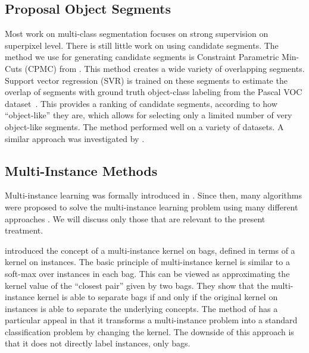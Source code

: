 \subsection{Proposal Object Segments}\label{related_segments}
Most work on multi-class segmentation focuses on strong supervision on superpixel level. There is still little work on using candidate segments.
The method we use for generating candidate segments is Constraint Parametric Min-Cuts (CPMC) from \citet{carreira2010constrained}.
This method creates a wide variety of overlapping segments. Support vector regression (SVR) is trained on these segments
to estimate the overlap of segments with ground truth object-class labeling
from the Pascal VOC dataset~\citep{pascal}. This provides a ranking of candidate segments, according to how ``object-like'' they are, which
allows for selecting only a limited number of very object-like segments.
The method performed well on a variety of datasets.
A similar approach was investigated by \citet{endres2010category}.

\subsection{Multi-Instance Methods}
Multi-instance learning was formally introduced in \citet{dietterich1997solving}.
Since then, many algorithms were proposed to solve the multi-instance learning problem
using many different approaches \citep{andrews2003support,gaertner2002multi,zhou2009multi,li2009convex,zhang2002dd,mangasarian2008multiple,leistner2010miforests,chen2006miles}.
We will discuss only those that are relevant to the present treatment.

\citet{gaertner2002multi} introduced the concept of a multi-instance
kernel on bags, defined in terms of a kernel on instances. 
The basic principle of multi-instance kernel is similar to a soft-max over instances in
each bag. This can be viewed as approximating the kernel value of the ``closest pair'' given by two bags. They show that the multi-instance kernel
is able to separate bags if and only if the original kernel on instances is able to separate the underlying concepts.
The method of \citet{gaertner2002multi} has a particular appeal in that it transforms a multi-instance problem into a standard
classification problem by changing the kernel. The downside of this approach is that it does
not directly label instances, only bags.

